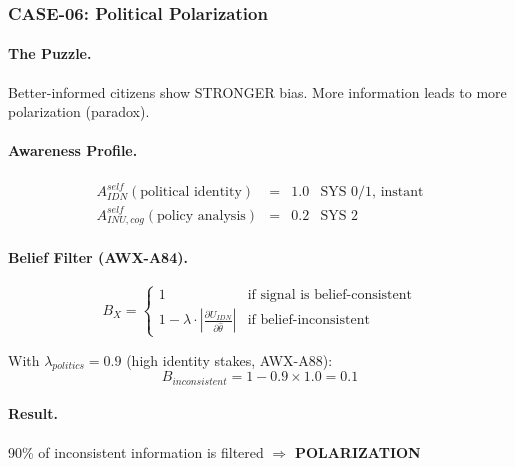 
\subsubsection{CASE-06: Political Polarization}

\paragraph{The Puzzle.}
Better-informed citizens show STRONGER bias. More information leads to more polarization (paradox).

\paragraph{Awareness Profile.}

\begin{equation}
\begin{array}{lcll}
A^{self}_{IDN}(\text{political identity}) & = & \mathbf{1.0} & \text{SYS 0/1, instant} \\
A^{self}_{INU,cog}(\text{policy analysis}) & = & 0.2 & \text{SYS 2}
\end{array}
\end{equation}

\paragraph{Belief Filter (AWX-A84).}
\begin{equation}
B_X = \begin{cases} 
1 & \text{if signal is belief-consistent} \\
1 - \lambda \cdot \left| \frac{\partial U_{IDN}}{\partial \hat{\theta}} \right| & \text{if belief-inconsistent}
\end{cases}
\end{equation}

With $\lambda_{politics} = 0.9$ (high identity stakes, AWX-A88):
\begin{equation}
B_{inconsistent} = 1 - 0.9 \times 1.0 = \mathbf{0.1}
\end{equation}

\paragraph{Result.}
90\% of inconsistent information is filtered $\Rightarrow$ \textbf{POLARIZATION}

